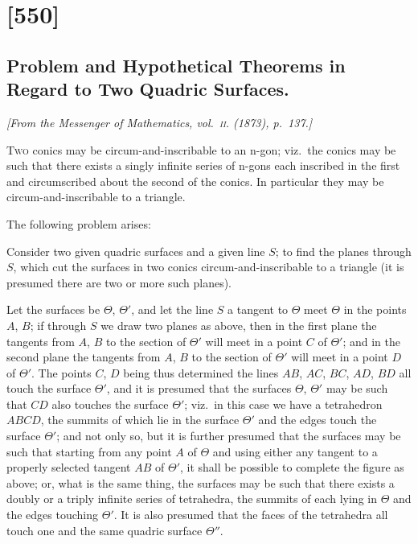 \documentclass[11pt,a4paper]{article}
\theoremstyle{plain}
\theoremstyle{definition}
\begin{document}
\section{[550]}
\subsection{Problem and Hypothetical Theorems in Regard to Two Quadric Surfaces.}

\begin{center}
\textit{[From the Messenger of Mathematics, vol.~\textsc{ii}. (1873), p.~137.]}
\end{center}

\textsc{Two} conics may be circum-and-inscribable to an n-gon; viz.\ the conics may be
such that there exists a singly infinite series of n-gons each inscribed in the first and
circumscribed about the second of the conics.  In particular they may be circum-and-inscribable to a triangle.

The following problem arises:

Consider two given quadric surfaces and a given line $S$; to find the planes through
$S$, which cut the surfaces in two conics circum-and-inscribable to a triangle (it is
presumed there are two or more such planes).

Let the surfaces be $\Theta$, $\Theta'$, and let the line $S$ a tangent to $\Theta$ meet $\Theta$ in the
points $A$, $B$; if through $S$ we draw two planes as above, then in the first plane the
tangents from $A$, $B$ to the section of $\Theta'$ will meet in a point $C$ of $\Theta'$; and in the
second plane the tangents from $A$, $B$ to the section of $\Theta'$ will meet in a point $D$
of $\Theta'$. The points $C$, $D$ being thus determined the lines $AB$, $AC$, $BC$, $AD$, $BD$ all
touch the surface $\Theta'$, and it is presumed that the surfaces $\Theta$, $\Theta'$ may be such that
$CD$ also touches the surface $\Theta'$; viz.\ in this case we have a tetrahedron $ABCD$, the
summits of which lie in the surface $\Theta'$ and the edges touch the surface $\Theta'$; and not
only so, but it is further presumed that the surfaces may be such that starting from
any point $A$ of $\Theta$ and using either any tangent to a properly selected tangent $AB$
of $\Theta'$, it shall be possible to complete the figure as above; or, what is the same thing,
the surfaces may be such that there exists a doubly or a triply infinite series of
tetrahedra, the summits of each lying in $\Theta$ and the edges touching $\Theta'$. It is also
presumed that the faces of the tetrahedra all touch one and the same quadric surface $\Theta''$.
\end{document}
